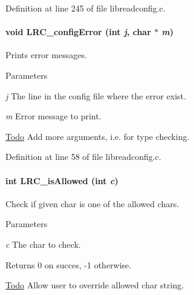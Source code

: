 Definition at line 245 of file libreadconfig.c.\hypertarget{group___l_r_c__internals_ga0768167abe6a143840f26439a86ec79d}{
\paragraph[{LRC\_\-configError}]{\setlength{\rightskip}{0pt plus 5cm}void LRC\_\-configError (int {\em j}, \/  char $\ast$ {\em m})}\hfill}
\label{group___l_r_c__internals_ga0768167abe6a143840f26439a86ec79d}


Prints error messages. 
\begin{DoxyParams}{Parameters}
\item[{\em j}]The line in the config file where the error exist.\item[{\em m}]Error message to print.\end{DoxyParams}
\begin{Desc}
\item[\hyperlink{todo__todo000001}{Todo}]Add more arguments, i.e. for type checking.\end{Desc}


Definition at line 58 of file libreadconfig.c.\hypertarget{group___l_r_c__internals_ga6ac7bc617b346047519f4c3589a311bd}{
\paragraph[{LRC\_\-isAllowed}]{\setlength{\rightskip}{0pt plus 5cm}int LRC\_\-isAllowed (int {\em c})}\hfill}
\label{group___l_r_c__internals_ga6ac7bc617b346047519f4c3589a311bd}


Check if given char is one of the allowed chars. 
\begin{DoxyParams}{Parameters}
\item[{\em c}]The char to check.\end{DoxyParams}
\begin{DoxyReturn}{Returns}
0 on succes, -\/1 otherwise.
\end{DoxyReturn}
\begin{Desc}
\item[\hyperlink{todo__todo000002}{Todo}]Allow user to override allowed char string. \end{Desc}


